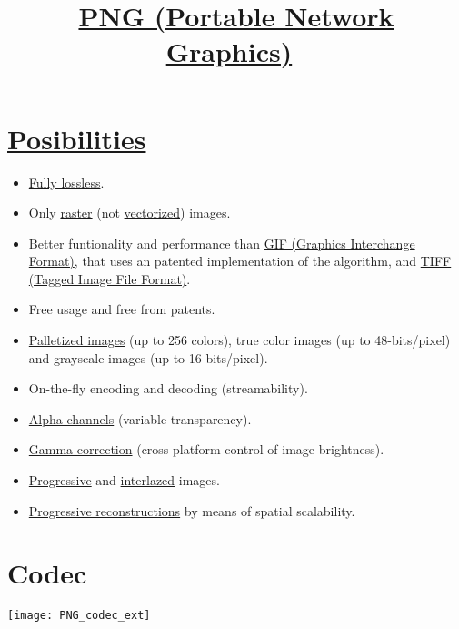 \title{\href{http://www.libpng.org/pub/png}{PNG (Portable
  Network Graphics)}~\cite{roelofs1999png}}

\maketitle
\tableofcontents

\section{\href{http://www.libpng.org/pub/png/book/}{Posibilities}}
\begin{itemize}
\item \href{https://en.wikipedia.org/wiki/Lossless_compression}{Fully
  lossless}.
\item Only
  \href{https://en.wikipedia.org/wiki/Raster_graphics}{raster} (not
  \href{https://en.wikipedia.org/wiki/Vector_graphics}{vectorized})
  images.
\item Better funtionality and performance than
  \href{https://en.wikipedia.org/wiki/GIF}{GIF (Graphics Interchange
    Format)}, that uses an patented implementation of the
   algorithm, and
  \href{https://en.wikipedia.org/wiki/TIFF}{TIFF (Tagged Image File
    Format)}.
\item Free usage and free from patents.
\item
  \href{https://en.wikipedia.org/wiki/Palette_(computing)}{Palletized
    images} (up to 256 colors), true color images (up to
  48-bits/pixel) and grayscale images (up to 16-bits/pixel).
\item On-the-fly encoding and decoding (streamability).
\item \href{https://en.wikipedia.org/wiki/Alpha_compositing}{Alpha
  channels} (variable transparency).
\item \href{https://en.wikipedia.org/wiki/Gamma_correction}{Gamma
  correction} (cross-platform control of image brightness).
\item
  \href{https://en.wikipedia.org/wiki/Progressive_scan}{Progressive}
  and
  \href{https://en.wikipedia.org/wiki/Interlacing_(bitmaps)}{interlazed}
  images.
\item
  \href{http://www.libpng.org/pub/png/book/chapter08.html#png.ch08.div.6}{Progressive
    reconstructions} by means of spatial scalability.
\end{itemize} 

\section{Codec}
\begin{center}
\texttt{[image: PNG\_codec\_ext]}
\end{center}

